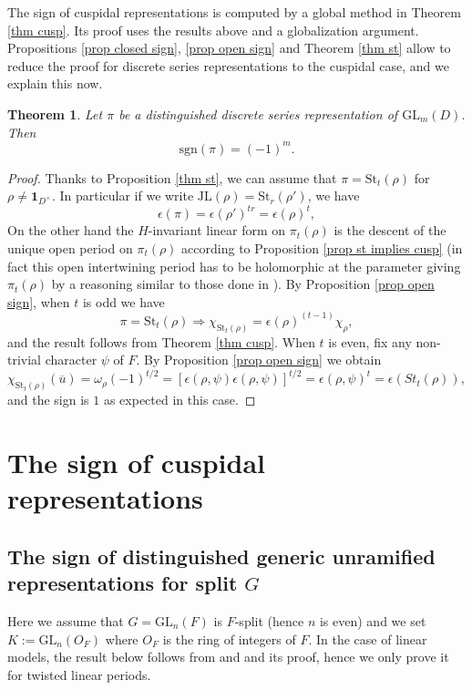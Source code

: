 \documentclass[11pt,letterpaper]{amsart}
\newcommand{\GL}{{\mathrm {GL}}} \newcommand{\PGL}{{\mathrm {PGL}}}
\newcommand{\triv}{{\mathbf{1}}}
\newcommand{\JL}{{\mathrm{JL}}}
\def\e{\epsilon}
\def\St{\mathrm{St}}
\theoremstyle{plain}
\newtheorem{thm}{Theorem}[section] \newtheorem{cor}[thm]{Corollary}
\numberwithin{equation}{section}
\newcommand{\sg}{\mathrm{sgn}}
\begin{document}
The sign of cuspidal representations is computed by a global method in Theorem \ref{thm cusp}. Its proof uses the results above and a globalization argument. Propositions \ref{prop closed sign}, \ref{prop open sign} and Theorem \ref{thm st} allow to reduce the proof for discrete series representations to the cuspidal case, and we explain this now. 

\begin{thm}\label{thm disc}
Let $\pi$ be a distinguished discrete series representation of $\GL_m(D)$. Then \[\sg(\pi)=(-1)^m.\] 
\end{thm}
\begin{proof}
Thanks to Proposition \ref{thm st}, we can assume that $\pi=\St_t(\rho)$ for $\rho\neq \triv_{D^\times}$. In particular if we write $\JL(\rho)=\St_r(\rho')$, we have 
\[\e(\pi)=\e(\rho')^{tr}=\e(\rho)^{t},\] On the other hand the $H$-invariant linear form on $\pi_t(\rho)$ is the descent of the unique open period on $\pi_t(\rho)$ according to Proposition \ref{prop st implies cusp} (in fact this open intertwining period has to be holomorphic at the parameter giving $\pi_t(\rho)$ by a reasoning similar to those done in \cite{MatJFA}). By Proposition \ref{prop open sign}, when $t$ is odd we have 
\[\pi=\St_t(\rho)\Rightarrow\chi_{\St_t(\rho)}=\e(\rho)^{(t-1)}\chi_{\rho},\] and the result follows from Theorem \ref{thm cusp}. When $t$ is even, fix any non-trivial character $\psi$ of $F$. By Proposition \ref{prop open sign} we obtain \[\chi_{\St_t(\rho)}(\overline{u})=\omega_{\rho}(-1)^{t/2}=[\e(\rho,\psi)\e(\rho,\psi)]^{t/2}=\e(\rho,\psi)^t=\e(St_t(\rho)),\] and the sign is $1$ as expected in this case.
\end{proof}

\section{The sign of cuspidal representations}\label{sec cusp}
 
\subsection{The sign of distinguished generic unramified representations for split $G$}\label{sec gen UR sign}

Here we assume that $G=\GL_n(F)$ is $F$-split (hence $n$ is even) and we set $K:=\GL_n(O_F)$ where $O_F$ is the ring of integers of $F$. In the case of linear models, the result below follows from \cite[Theorem 5.1]{MatBLMS} and \cite[Proposition 3.2]{FJ} and its proof, hence we only prove it for twisted linear periods. 
 
\end{document}
